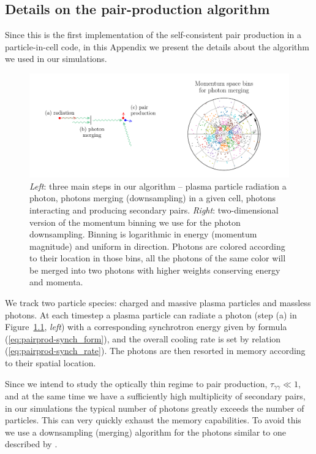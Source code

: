 \chapter{}
\section{Details on the pair-production algorithm}
\label{sec:pairprod-appendixA}

Since this is the first implementation of the self-consistent pair production in a particle-in-cell code, in this Appendix we present the details about the algorithm we used in our simulations.

\begin{figure}[htb]
    \centering
    \includegraphics[width=.8\textwidth]{figures/ch4-pairproduction/fig_a1.pdf}
    \caption{{\it Left}: three main steps in our algorithm -- plasma particle radiation a photon, photons merging (downsampling) in a given cell, photons interacting and producing secondary pairs. {\it Right}: two-dimensional version of the momentum binning we use for the photon downsampling. Binning is logarithmic in energy (momentum magnitude) and uniform in direction. Photons are colored according to their location in those bins, all the photons of the same color will be merged into two photons with higher weights conserving energy and momenta.}
    \label{fig:pairprod-alg_scheme}
\end{figure}

We track two particle species: charged and massive plasma particles and massless photons. At each timestep a plasma particle can radiate a photon (step (a) in Figure~\ref{fig:pairprod-alg_scheme}, {\it left}) with a corresponding synchrotron energy given by formula (\ref{eq:pairprod-synch_form}), and the overall cooling rate is set by relation (\ref{eq:pairprod-synch_rate}). The photons are then resorted in memory according to their spatial location.

Since we intend to study the optically thin regime to pair production, $\tau_{\gamma\gamma}\ll1$, and at the same time we have a sufficiently high multiplicity of secondary pairs, in our simulations the typical number of photons greatly exceeds the number of particles. This can very quickly exhaust the memory capabilities. To avoid this we use a downsampling (merging) algorithm for the photons similar to one described by \cite{2015CoPhC.191...65V}.

